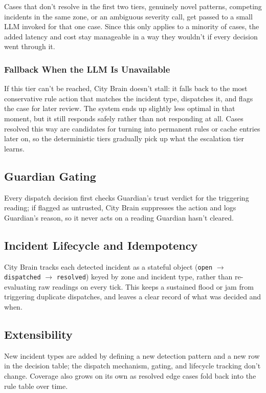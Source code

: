 \documentclass[10pt,letterpaper]{article}
\begin{document}
Cases that don't resolve in the first two tiers, genuinely novel patterns, competing incidents in the same zone, or an ambiguous severity call, get passed to a small LLM invoked for that one case. Since this only applies to a minority of cases, the added latency and cost stay manageable in a way they wouldn't if every decision went through it.

\subsubsection*{Fallback When the LLM Is Unavailable}

If this tier can't be reached, City Brain doesn't stall: it falls back to the most conservative rule action that matches the incident type, dispatches it, and flags the case for later review. The system ends up slightly less optimal in that moment, but it still responds safely rather than not responding at all. Cases resolved this way are candidates for turning into permanent rules or cache entries later on, so the deterministic tiers gradually pick up what the escalation tier learns.

\subsection{Guardian Gating}

Every dispatch decision first checks Guardian's trust verdict for the triggering reading; if flagged as untrusted, City Brain suppresses the action and logs Guardian's reason, so it never acts on a reading Guardian hasn't cleared.

\subsection{Incident Lifecycle and Idempotency}

City Brain tracks each detected incident as a stateful object (\texttt{open} $\rightarrow$ \texttt{dispatched} $\rightarrow$ \texttt{resolved}) keyed by zone and incident type, rather than re-evaluating raw readings on every tick. This keeps a sustained flood or jam from triggering duplicate dispatches, and leaves a clear record of what was decided and when.

\subsection{Extensibility}

New incident types are added by defining a new detection pattern and a new row in the decision table; the dispatch mechanism, gating, and lifecycle tracking don't change. Coverage also grows on its own as resolved edge cases fold back into the rule table over time.
\end{document}

